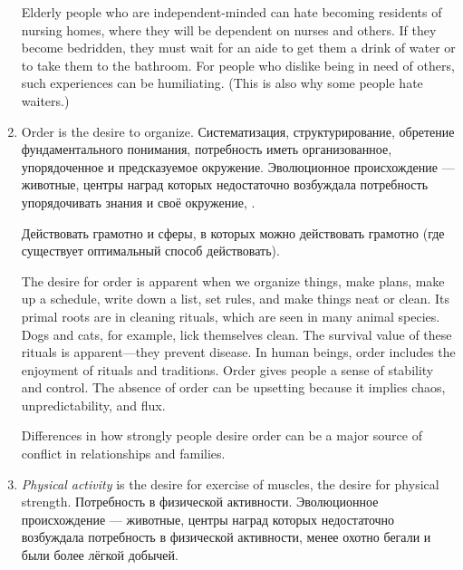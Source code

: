 \documentclass[11pt]{article}
\theoremstyle{remark}
\theoremstyle{definition}
\begin{document}
\begin{enumerate}
Elderly people who are independent-minded can hate becoming residents of nursing homes, where they will be dependent on nurses and others. If they become bedridden, they must wait for an aide to get them a drink of water or to take them to the bathroom. For people who dislike being in need of others, such experiences can be humiliating. (This is also why some people hate waiters.)

\item Order is the desire to organize. Систематизация, структурирование, обретение фундаментального понимания, потребность иметь организованное, упорядоченное и предсказуемое окружение. Эволюционное происхождение --- животные, центры наград которых недостаточно возбуждала потребность упорядочивать знания и своё окружение, .


Действовать грамотно и сферы, в которых можно действовать грамотно (где существует оптимальный способ действовать). 


The desire for order is apparent when we organize things, make plans, make up a schedule, write down a list, set rules, and make things neat or clean. Its primal roots are in cleaning rituals, which are seen in many animal species. Dogs and cats, for example, lick themselves clean. The survival value of these rituals is apparent—they prevent disease. In human beings, order includes the enjoyment of rituals and traditions. Order gives people a sense of stability and control. The absence of order can be upsetting because it implies chaos, unpredictability, and flux.

Differences in how strongly people desire order can be a major source of conflict in relationships and families.



\item \textit{Physical activity} is the desire for exercise of muscles, the desire for physical strength. Потребность в физической активности. Эволюционное происхождение --- животные, центры наград которых недостаточно возбуждала потребность в физической активности, менее охотно бегали и были более лёгкой добычей. %


\end{enumerate}
\end{document}
